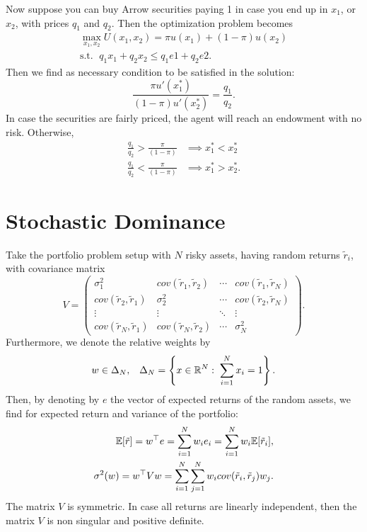 \documentclass[twoside, titlepage]{article}
\begin{document}
Now suppose you can buy Arrow securities paying 1 in case you end up in $x_1$, or $x_2$, with prices $q_1$ and $q_2$. Then the optimization problem becomes
\begin{align*}
    \max_{x_1, x_2} U(x_1, x_2) = \pi u(x_1) + (1-\pi)u(x_2) \\
    \text{s.t. } \; q_1x_1 + q_2x_2 \leq q_1e1 + q_2e2.
\end{align*}
Then we find as necessary condition to be satisfied in the solution:
\[
    \frac{\pi u'(x^*_1)}{(1-\pi)u'(x^*_2)} = \frac{q_1}{q_2}.
\]
In case the securities are fairly priced, the agent will reach an endowment with no risk. Otherwise,
\begin{align*}
    \frac{q_1}{q_2} > \frac{\pi}{(1-\pi)} & \implies x^*_1 < x^*_2 \\
    \frac{q_1}{q_2} < \frac{\pi}{(1-\pi)} & \implies x^*_1 > x^*_2.
\end{align*}


\section{Stochastic Dominance}
Take the portfolio problem setup with $N$ risky assets, having random returns $\tilde{r}_i$, with covariance matrix
\[
    V = \begin{pmatrix}
        \sigma^2_1  & cov(\tilde{r}_1, \tilde{r}_2) & \cdots & cov(\tilde{r}_1, \tilde{r}_N) \\
        cov(\tilde{r}_2, \tilde{r}_1) & \sigma^2_2 & \cdots & cov(\tilde{r}_2, \tilde{r}_N) \\
        \vdots & \vdots & \ddots & \vdots \\
        cov(\tilde{r}_N, \tilde{r}_1) & cov(\tilde{r}_N, \tilde{r}_2) & \cdots & \sigma^2_N
    \end{pmatrix}.
\]
Furthermore, we denote the relative weights by
\[
    w \in \Delta_N, \;\;\; \Delta_N = \left\{x \in \mathbb{R}^N  : \; \sum_{i=1}^N x_i = 1\right\}.
\]
Then, by denoting by $e$ the vector of expected returns of the random assets, we find for expected return and variance of the portfolio:
\begin{align*}
    \mathbb{E}[\tilde{r}] = w^\top e = \sum^N_{i=1}w_ie_i = \sum^N_{i=1}w_i\mathbb{E}[\tilde{r}_i], \\
    \sigma^2(w) = w^\top V w = \sum^N_{i=1}\sum^N_{j=1}w_icov(\tilde{r}_i, \tilde{r}_j)w_j.
\end{align*}
The matrix $V$ is symmetric. In case all returns are linearly independent, then the matrix $V$ is non singular and positive definite.
\end{document}
